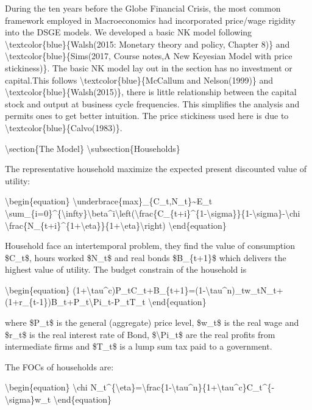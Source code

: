 \documentclass[10pt,math=newtx,citestyle=gb7714-2015,bibstyle=gb7714-2015]{elegantbook}
\begin{document}
	During the ten years before the Globe Financial Crisis, the most common framework employed in Macroeconomics had incorporated price/wage rigidity into the DSGE models. We developed a basic NK model following \textbackslash{}textcolor\{blue\}\{Walsh(2015: Monetary theory and policy, Chapter 8)\} and \textbackslash{}textcolor\{blue\}\{Sims(2017, Course notes,A New Keyesian Model with price stickiness)\}. The basic NK model lay out in the section has no investment or capital.This follows \textbackslash{}textcolor\{blue\}\{McCallum and Nelson(1999)\} and \textbackslash{}textcolor\{blue\}\{Walsh(2015)\}, there is little relationship between the capital stock and output at business cycle frequencies. This simplifies the analysis and permits ones to get better intuition. The price stickiness used here is due to \textbackslash{}textcolor\{blue\}\{Calvo(1983)\}.
	
	\textbackslash{}section\{The Model\}
	\textbackslash{}subsection\{Households\}
	
	The representative household maximize the expected present discounted value of utility:
	
	\textbackslash{}begin\{equation\}
	\textbackslash{}underbrace\{max\}\_\{C\_t,N\_t\}\~{}E\_t \textbackslash{}sum\_\{i=0\}\^{}\{\textbackslash{}infty\}\textbackslash{}beta\^{}i\textbackslash{}left(\textbackslash{}frac\{C\_\{t+i\}\^{}\{1-\textbackslash{}sigma\}\}\{1-\textbackslash{}sigma\}-\textbackslash{}chi \textbackslash{}frac\{N\_\{t+i\}\^{}\{1+\textbackslash{}eta\}\}\{1+\textbackslash{}eta\}\textbackslash{}right)
	\textbackslash{}end\{equation\}
	
	Household face an intertemporal problem, they find the value of consumption \$C\_t\$, hours worked \$N\_t\$ and real bonds \$B\_\{t+1\}\$ which delivers the highest value of utility. The budget constrain of the household is
	
	\textbackslash{}begin\{equation\}
	(1+\textbackslash{}tau\^{}c)P\_tC\_t+B\_\{t+1\}=(1-\textbackslash{}tau\^{}n)\_tw\_tN\_t+(1+r\_\{t-1\})B\_t+P\_t\textbackslash{}Pi\_t-P\_tT\_t
	\textbackslash{}end\{equation\}
	
	where \$P\_t\$ is the general (aggregate) price level, \$w\_t\$ is the real wage and \$r\_t\$ is the real interest rate of Bond, \$\textbackslash{}Pi\_t\$ are the real profits from intermediate firms and \$T\_t\$ is a lump sum tax paid to a government.
	
	The FOCs of households are:
	
	\textbackslash{}begin\{equation\}
	\textbackslash{}chi N\_t\^{}\{\textbackslash{}eta\}=\textbackslash{}frac\{1-\textbackslash{}tau\^{}n\}\{1+\textbackslash{}tau\^{}c\}C\_t\^{}\{-\textbackslash{}sigma\}w\_t
	\textbackslash{}end\{equation\}
	
\end{document}
